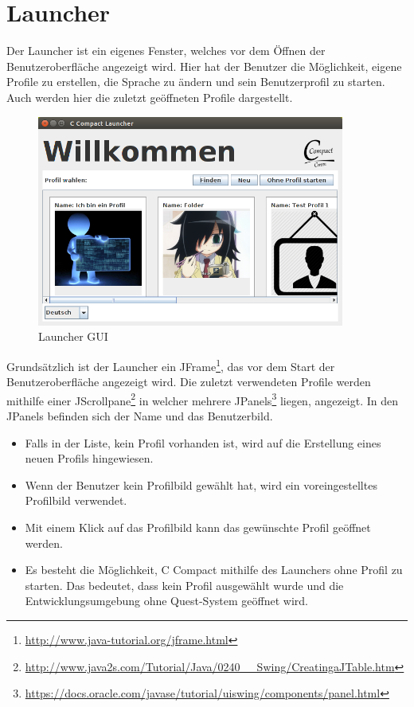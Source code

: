\section{Launcher}
Der Launcher ist ein eigenes Fenster, welches vor dem Öffnen der Benutzeroberfläche angezeigt wird. Hier hat der Benutzer die Möglichkeit, eigene Profile zu erstellen, die Sprache zu ändern und sein Benutzerprofil zu starten. Auch werden hier die zuletzt geöffneten Profile dargestellt.

\begin{figure}[h] 
  \centering
     \includegraphics[width=0.9\textwidth]{./media/images/gui/launcher/launcher_main.png}
  \caption{Launcher GUI}
  \label{fig:launcher_GUI}
\end{figure}

Grundsätzlich ist der Launcher ein JFrame\footnote{\url{http://www.java-tutorial.org/jframe.html}}, das vor dem Start der Benutzeroberfläche angezeigt wird. Die zuletzt verwendeten Profile werden mithilfe einer JScrollpane\footnote{\url{http://www.java2s.com/Tutorial/Java/0240__Swing/CreatingaJTable.htm}}  in welcher mehrere JPanels\footnote{\url{https://docs.oracle.com/javase/tutorial/uiswing/components/panel.html}} liegen, angezeigt. In den JPanels befinden sich der Name und das Benutzerbild.

\begin{itemize}
\item Falls in der Liste, kein Profil vorhanden ist, wird auf die Erstellung eines neuen Profils hingewiesen.
\item Wenn der Benutzer kein Profilbild gewählt hat, wird ein voreingestelltes Profilbild verwendet.
\item Mit einem Klick auf das Profilbild kann das gewünschte Profil geöffnet werden.
\item Es besteht die Möglichkeit, C Compact mithilfe des Launchers ohne Profil zu starten. Das bedeutet, dass kein Profil ausgewählt wurde und die Entwicklungsumgebung ohne Quest-System geöffnet wird.
\end{itemize}

